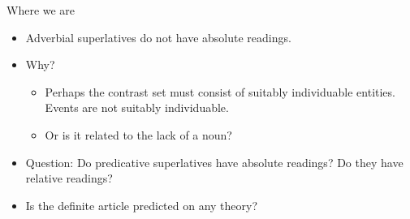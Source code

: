 \documentclass[xcolor=dvipsnames]{beamer}
\begin{document}
\begin{frame}{Where we are}

\begin{itemize}
\item Adverbial superlatives do not have absolute readings.
\item Why? 
\begin{itemize}
\item Perhaps the contrast set must consist of suitably
  individuable entities. Events are not suitably individuable.
\item Or is it related to the lack of a noun?
\end{itemize}
\item Question: Do predicative superlatives have absolute readings? Do
  they have relative readings?
\item Is the definite article predicted on any theory?
\end{itemize}

\end{frame}



\begin{frame}
\tiny


\end{frame}
\end{document}
